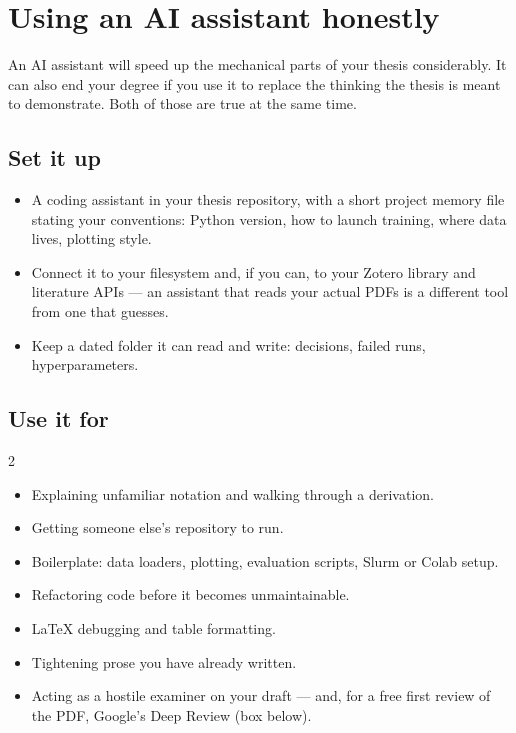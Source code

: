 \documentclass[11pt,a4paper]{article}
\begin{document}
\section{Using an AI assistant honestly}
\label{sec:ai}

An AI assistant will speed up the mechanical parts of your thesis
considerably. It can also end your degree if you use it to replace the thinking
the thesis is meant to demonstrate. Both of those are true at the same time.

\subsection{Set it up}

\begin{itemize}
  \item A coding assistant in your thesis repository, with a short project
        memory file stating your conventions: Python version, how to launch
        training, where data lives, plotting style.
  \item Connect it to your filesystem and, if you can, to your Zotero library
        and literature APIs --- an assistant that reads your actual PDFs is a
        different tool from one that guesses.
  \item Keep a dated  folder it can read and write: decisions,
        failed runs, hyperparameters.
\end{itemize}

\subsection{Use it for}

\begin{multicols}{2}
\begin{itemize}
  \item Explaining unfamiliar notation and walking through a derivation.
  \item Getting someone else's repository to run.
  \item Boilerplate: data loaders, plotting, evaluation scripts, Slurm or
        Colab setup.
  \item Refactoring code before it becomes unmaintainable.
  \item LaTeX debugging and table formatting.
  \item Tightening prose you have already written.
  \item Acting as a hostile examiner on your draft --- and, for a free first
        review of the PDF, Google's Deep Review (box below).
\end{itemize}
\end{multicols}
\end{document}
